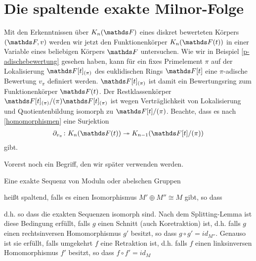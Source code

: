 \documentclass[ngerman,fontsize=11pt, paper=a4, parskip=half, titlepage=true, toc=bib]{scrartcl}
\begin{document}

\section{Die spaltende exakte Milnor-Folge}

Mit den Erkenntnissen über $\KnF$ eines diskret bewerteten 
Körpers $(\F,v)$ werden wir jetzt den Funktionenkörper $\KnFt$ 
in einer Variable eines beliebigen Körpers $\F$ untersuchen. 
Wie wir in Beispiel \ref{p-adischebewertung} gesehen haben, 
kann für ein fixes Primelement $\pi$ auf der Lokalisierung 
$\F[t]_{(\pi)}$ des euklidischen Rings $\F[t]$ eine $\pi$-adische
Bewertung $v_\pi$ definiert werden. $\F[t]_{(\pi)}$ ist damit ein
Bewertungsring zum Funktionenkörper $\Ft $.
Der Restklassenkörper $\F[t]_{(\pi)}/(\pi)\F[t]_{(\pi)}$ ist wegen
Verträglichkeit von Lokalisierung und Quotientenbildung isomorph zu
$\F[t]/(\pi)$.
Beachte, dass es nach \ref{homomorphismen} eine Surjektion
\begin{gather*}
  \partial_{v_\pi}\colon \KnFt\twoheadrightarrow \K_{n-1}(\Ftpi)
\end{gather*}
gibt.

Vorerst noch ein Begriff, den wir später verwenden werden.
\begin{Def}\label{spaltendeexaktesequenz}
  Eine exakte Sequenz von Moduln oder abelschen Gruppen
  \begin{center}
  \end{center}
  heißt spaltend, falls es einen Isomorphismus $M'\oplus M''\cong M$
  gibt, so dass
  \begin{center}
  \end{center}
  d.h. so dass die exakten Sequenzen isomorph sind.
  Nach dem Splitting-Lemma ist diese Bedingung 
  erfüllt, falls $g$ einen Schnitt (auch Koretraktion) ist, 
  d.h. falls $g$ einen rechtsinversen Homomorphismus
  $g'$ besitzt, so dass $g\circ g'=id_{M''}$.
  Genauso ist sie erfüllt, falls umgekehrt $f$ eine Retraktion ist,
  d.h. falls $f$ einen linksinversen Homomorphismus 
  $f'$ besitzt, so dass $f\circ f'=id_{M}$
  \cite[siehe auch][Kap. 1.5]{bosch}
\end{Def}
\end{document}
